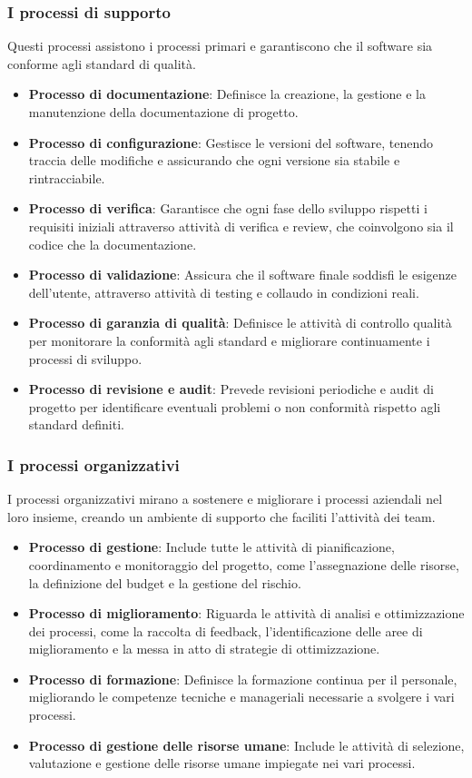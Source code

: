 \subsubsection{I processi di supporto}
Questi processi assistono i processi primari e garantiscono che il software sia conforme agli standard di qualità.
\begin{itemize}
    \item \textbf{Processo di documentazione}: Definisce la creazione, la gestione e la manutenzione della documentazione di progetto.
    \item \textbf{Processo di configurazione}: Gestisce le versioni del software, tenendo traccia delle modifiche e assicurando che ogni versione sia stabile e rintracciabile.
    \item \textbf{Processo di verifica}: Garantisce che ogni fase dello sviluppo rispetti i requisiti iniziali attraverso attività di verifica e review, che coinvolgono sia il codice che la documentazione.
    \item \textbf{Processo di validazione}: Assicura che il software finale soddisfi le esigenze dell'utente, attraverso attività di testing e collaudo in condizioni reali.
    \item \textbf{Processo di garanzia di qualità}: Definisce le attività di controllo qualità per monitorare la conformità agli standard e migliorare continuamente i processi di sviluppo.
    \item \textbf{Processo di revisione e audit}: Prevede revisioni periodiche e audit di progetto per identificare eventuali problemi o non conformità rispetto agli standard definiti.
\end{itemize}

\subsubsection{I processi organizzativi}
I processi organizzativi mirano a sostenere e migliorare i processi aziendali nel loro insieme, creando un ambiente di supporto che faciliti l'attività dei team.
\begin{itemize}
    \item \textbf{Processo di gestione}: Include tutte le attività di pianificazione, coordinamento e monitoraggio del progetto, come l'assegnazione delle risorse, la definizione del budget e la gestione del rischio.
    \item \textbf{Processo di miglioramento}: Riguarda le attività di analisi e ottimizzazione dei processi, come la raccolta di feedback, l'identificazione delle aree di miglioramento e la messa in atto di strategie di ottimizzazione.
    \item \textbf{Processo di formazione}: Definisce la formazione continua per il personale, migliorando le competenze tecniche e manageriali necessarie a svolgere i vari processi.
    \item \textbf{Processo di gestione delle risorse umane}: Include le attività di selezione, valutazione e gestione delle risorse umane impiegate nei vari processi.
\end{itemize}

